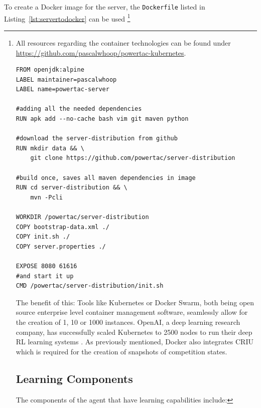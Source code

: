 To create a Docker image for the server, the \texttt{Dockerfile} listed in Listing~\ref{lst:servertodocker} can be used
\footnote{All resources regarding the container technologies can be found under \url{https://github.com/pascalwhoop/powertac-kubernetes}.  

\begin{listing}[h]
	
\begin{verbatim}
FROM openjdk:alpine
LABEL maintainer=pascalwhoop
LABEL name=powertac-server

#adding all the needed dependencies
RUN apk add --no-cache bash vim git maven python

#download the server-distribution from github
RUN mkdir data && \
	git clone https://github.com/powertac/server-distribution

#build once, saves all maven dependencies in image
RUN cd server-distribution && \
	mvn -Pcli

WORKDIR /powertac/server-distribution
COPY bootstrap-data.xml ./
COPY init.sh ./
COPY server.properties ./

EXPOSE 8080 61616
#and start it up
CMD /powertac/server-distribution/init.sh
\end{verbatim}
\caption{Turning the current server snapshot into a docker image}
\label{lst:servertodocker}
\end{listing}

The benefit of this: Tools like Kubernetes or Docker Swarm, both being open source enterprise level container management
software, seamlessly allow for the creation of 1, 10 or 1000 instances. OpenAI, a deep learning research company, has
successfully scaled Kubernetes to 2500 nodes to run their deep \ac{RL} learning systems \citep{openai2500}. As
previously mentioned, Docker also integrates \ac{CRIU} which is required for the creation of snapshots of competition
states.  



\section{Learning Components}
\label{sec:learning_components}
The components of the agent that have learning capabilities include: 

}
